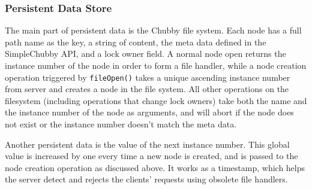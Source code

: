 \subsubsection{Persistent Data Store}

The main part of persistent data is the Chubby file system. Each node has
a full path name as the key, a string of content, the meta data defined
in the SimpleChubby API, and a lock owner field. A normal node open returns
the instance number of the node in order to form a file handler, while
a node creation operation triggered by \texttt{fileOpen()} takes a unique ascending
instance number from server and creates a node in the file system. All other
operations on the filesystem (including operations that change lock owners)
take both the name and the instance number of the node as arguments, and will
abort if the node does not exist or the instance number doesn't match the
meta data.

Another persistent data is the value of the next instance number. This global
value is increased by one every time a new node is created, and is passed
to the node creation operation as discussed above. It works as a timestamp,
which helps the server detect and rejects the clients' requests using obsolete
file handlers.
